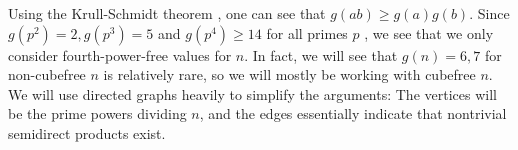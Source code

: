 \documentclass[draft]{article}
\theoremstyle{plain}
\theoremstyle{definition}
\begin{document}
Using the Krull-Schmidt theorem {\cite{hungerford}}, one can see that $g(ab) \ge g(a)g(b)$. Since $g(p^2) = 2, g(p^3) = 5$ and $g(p^4) \ge 14$ for all primes $p$ {\cite{gnumoas}}, we see that we only consider fourth-power-free values for $n$. In fact, we will see that $g(n) = 6, 7$ for non-cubefree $n$ is relatively rare, so we will mostly be working with cubefree $n$. We will use directed graphs heavily to simplify the arguments: The vertices will be the prime powers dividing $n$, and the edges essentially indicate that nontrivial semidirect products exist.


%
%
%
%
\end{document}
